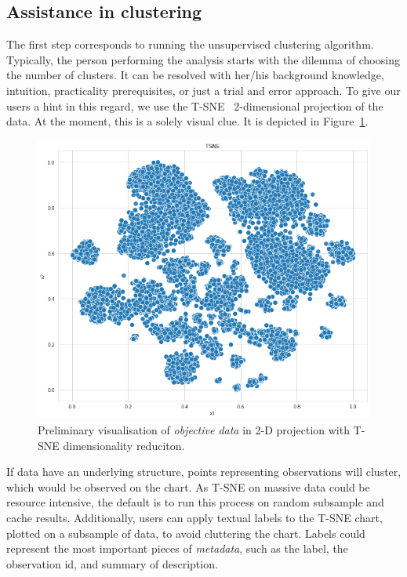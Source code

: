 \documentclass{article}
\begin{document}
\subsection{Assistance in clustering}\label{subsec:assistance-in-clustering}
The first step corresponds to running the unsupervised clustering algorithm.
Typically, the person performing the analysis starts with the dilemma of choosing the number of clusters.
It can be resolved with her/his background knowledge, intuition, practicality prerequisites, or just a trial and error approach. %
To give our users a hint in this regard, we use the T-SNE~\cite{tsne} 2-dimensional projection of the data.
At the moment, this is a solely visual clue.
It is depicted in Figure~\ref{fig:tsne}.
\begin{figure}[h!]
    \centering
    \includegraphics[width=\linewidth]{example1-clustering-products-fashion-tex/output_57_1}
    \caption{Preliminary visualisation of \textit{objective data} in 2-D projection with T-SNE dimensionality reduciton.}
    \label{fig:tsne}
\end{figure}
If data have an underlying structure, points representing observations will cluster, which would be observed on the chart.
As T-SNE on massive data could be resource intensive, the default is to run this process on random subsample and cache results.
Additionally, users can apply textual labels to the T-SNE chart, plotted on a subsample of data, to avoid cluttering the chart. %
Labels could represent the most important pieces of \textit{metadata}, such as the label, the observation id, and summary of description.
\end{document}
